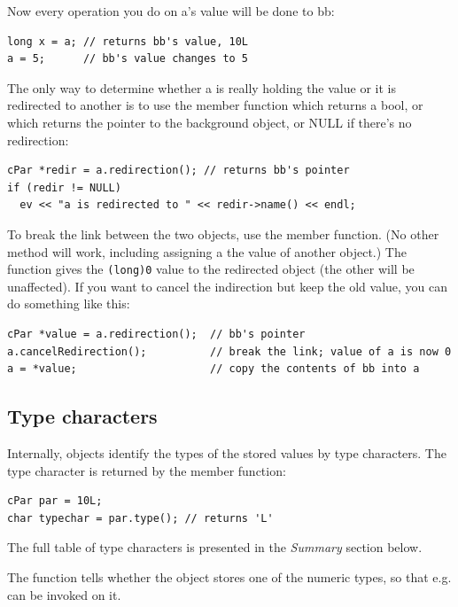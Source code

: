 Now every operation you do on a's value will be done to bb:

\begin{verbatim}
long x = a; // returns bb's value, 10L
a = 5;      // bb's value changes to 5
\end{verbatim}


The only way to determine whether a is really holding the value or it
is redirected to another  is to use the
 member function which returns a bool, or
 which returns the pointer to the background
object, or NULL if there's no redirection:

\begin{verbatim}
cPar *redir = a.redirection(); // returns bb's pointer
if (redir != NULL)
  ev << "a is redirected to " << redir->name() << endl;
\end{verbatim}


To break the link between the two objects, use the
 member function. (No other method will
work, including assigning a the value of another 
object.) The  function gives the \texttt{(long)0}
value to the redirected object (the other will be unaffected). If you
want to cancel the indirection but keep the old value, you can do
something like this:

\begin{verbatim}
cPar *value = a.redirection();  // bb's pointer
a.cancelRedirection();          // break the link; value of a is now 0
a = *value;                     // copy the contents of bb into a
\end{verbatim}




\subsection{Type characters}

Internally,  objects identify the types of the stored values
by type characters. The type character is returned by the 
member function:

\begin{verbatim}
cPar par = 10L;
char typechar = par.type(); // returns 'L'
\end{verbatim}

The full table of type characters is presented in the \textit{Summary}
section below.

The  function tells whether the object
stores one of the numeric types, so that e.g. 
can be invoked on it.




